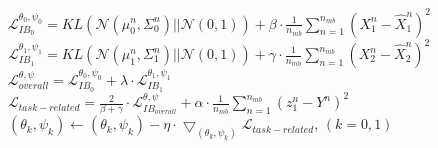 \begin{algorithm}[htb]
\begin{algorithmic}
         \State $\mathcal{L} _{IB_{0} }^{\theta _{0},\psi _{0} } =KL\left ( \mathcal{N}\left ( \mu _{0}^{n} ,\Sigma _{0}^{n}  \right )|| \mathcal{N}\left ( 0,1  \right )  \right )+\beta \cdot \frac{1}{n_{mb} }\sum_{n=1}^{n_{mb}}\left ( X_{1}^{n}-\hat{X}_{1}^{n}  \right )^{2}$
        \State $\mathcal{L} _{IB_{1} }^{\theta _{1},\psi _{1} } =KL\left ( \mathcal{N}\left ( \mu _{1}^{n} ,\Sigma _{1}^{n}  \right )|| \mathcal{N}\left ( 0,1  \right )  \right )+\gamma  \cdot \frac{1}{n_{mb} }\sum_{n=1}^{n_{mb}}\left ( X_{2}^{n}-\hat{X}_{2}^{n}  \right )^{2}$
    \EndIf
   \State $\mathcal{L} _{overall}^{\theta ,\psi }  = \mathcal{L}_{IB_{0}}^{\theta _{0},\psi _{0} } + \lambda \cdot \mathcal{L}_{IB_{1}}^{\theta _{1},\psi _{1} } $
   \State $\mathcal{L} _{task-related}  =\frac{2}{\beta + \gamma} \cdot \mathcal{L}_{IB_{overall}}^{\theta ,\psi} + \alpha\cdot\frac{1}{n_{mb} }\sum_{n=1}^{n_{mb}}\left ( z_{1}^{n}-Y^{n}  \right )^{2}  $
   \State $( \theta _{k} ,\psi _{k} ) \longleftarrow ( \theta _{k} ,\psi _{k} ) -\eta\cdot \bigtriangledown _( \theta _{k} ,\psi _{k} )\mathcal{L} _{task-related}$, $(k = 0,1)$
    \end{algorithmic}
\end{algorithm}